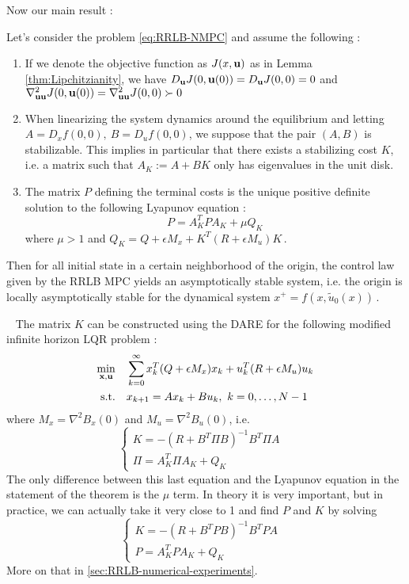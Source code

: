\documentclass[12pt]{article}
\begin{document}
Now our main result :

\begin{theorem}\label{thm:nominal-stability}
	Let's consider the problem \ref{eq:RRLB-NMPC} and assume the following :
	\begin{enumerate}
		\item If we denote the objective function as $J(x,\bf{u})$ as in Lemma \ref{thm:Lipchitzianity}, we have $D_\bf{u}J(0,\bf{u}(0))=D_\bf{u}J(0,0)=0$ and $\nabla^2_{\bf{u}\bf{u}}J(0,\bf{u}(0))=\nabla^2_{\bf{u}\bf{u}}J(0,0)\succ 0$

		\item When linearizing the system dynamics around the equilibrium and letting $A=D_xf(0,0),~B=D_uf(0,0)$, we suppose that the pair $(A,B)$ is stabilizable.
		This implies in particular that there exists a stabilizing cost $K$, i.e. a matrix such that $A_K:=A+BK$ only has eigenvalues in the unit disk.

		\item The matrix $P$ defining the terminal costs is the unique positive definite solution to the following Lyapunov equation :
		\begin{equation*}
			P=A_K^TPA_K+\mu Q_K
		\end{equation*}
		where $\mu>1$ and $Q_K=Q+\epsilon M_x+K^T(R+\epsilon M_u)K$\,.
	\end{enumerate}
	Then for all initial state in a certain neighborhood of the origin, the control law given by the RRLB MPC yields an asymptotically stable system, i.e. the origin is locally asymptotically stable for the dynamical system $x^+=f(x,\tilde{u}_0(x))$\,.
\end{theorem}

\begin{remark}~
	The matrix $K$ can be constructed using the DARE for the following modified infinite horizon LQR problem :
	\begin{align}
		\begin{split}\label{eq:inf-LQR}
			\underset{\bf{x},\bf{u}}{\min} &\quad \sum_{k=0}^\infty x_k^T(Q+\epsilon M_x)x_k+u_k^T(R+\epsilon M_u)u_k\\
			\text{s.t.} &\quad x_{k+1}=Ax_k+Bu_k,~k=0,\dots,N-1\\
		\end{split}
	\end{align}
	where $M_x=\nabla^2B_x(0)$ and $M_u=\nabla^2B_u(0)$, i.e.
	$$\begin{cases}
		K=-(R+B^T\Pi B)^{-1}B^T\Pi A&\\
		\Pi=A_K^T\Pi A_K+Q_K
	\end{cases}$$
	The only difference between this last equation and the Lyapunov equation in the statement of the theorem is the $\mu$ term.
	In theory it is very important, but in practice, we can actually take it very close to 1 and find $P$ and $K$ by solving
	$$\begin{cases}
		K=-(R+B^TP B)^{-1}B^TP A&\\
		P=A_K^TP A_K+Q_K
	\end{cases}$$
	More on that in \ref{sec:RRLB-numerical-experiments}.
\end{remark}
\end{document}
